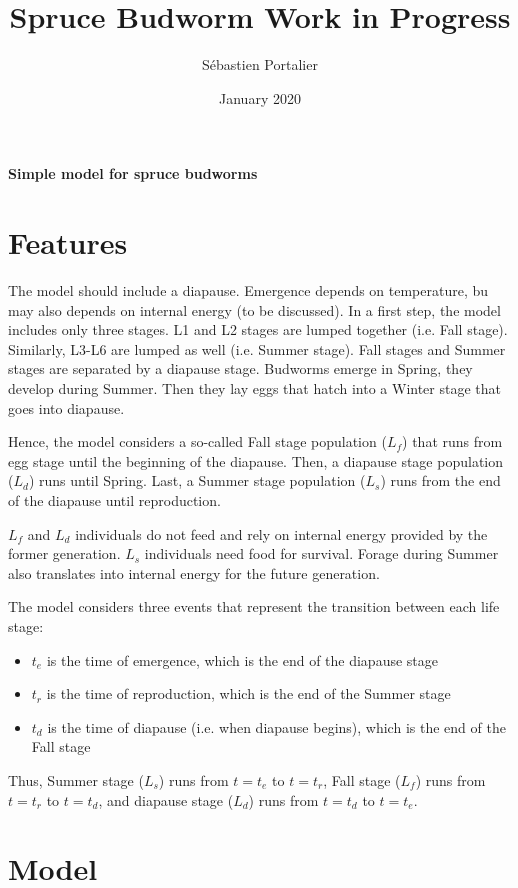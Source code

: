 \documentclass[12 pt]{article}
\title{Spruce Budworm Work in Progress}
\author{S\'ebastien Portalier}
\date{January 2020}
\begin{document}
\begin{center}
\begin{Large}
\textbf{Simple model for spruce budworms}
\end{Large}
\end{center}

\section{Features}
The model should include a diapause. Emergence depends on temperature, bu may also depends on internal energy (to be discussed). In a first step, the model includes only three stages. L1 and L2 stages are lumped together (i.e. Fall stage). Similarly, L3-L6 are lumped as well (i.e. Summer stage). Fall stages and Summer stages are separated by a diapause stage. Budworms emerge in Spring, they develop during Summer. Then they lay eggs that hatch into a Winter stage that goes into diapause. \par
Hence, the model considers a so-called Fall stage population ($L_f$) that runs from egg stage until the beginning of the diapause. Then, a diapause stage population ($L_d$) runs until Spring. Last, a Summer stage population ($L_s$) runs from the end of the diapause until reproduction. \par
$L_f$ and $L_d$ individuals do not feed and rely on internal energy provided by the former generation. $L_s$ individuals need food for survival. Forage during Summer also translates into internal energy for the future generation. \par
The model considers three events that represent the transition between each life stage: 
\begin{itemize}
\item $t_e$ is the time of emergence, which is the end of the diapause stage
\item $t_r$ is the time of reproduction, which is the end of the Summer stage
\item $t_d$ is the time of diapause (i.e. when diapause begins), which is the end of the Fall stage
\end{itemize}
Thus, Summer stage ($L_s$) runs from $t=t_e$ to $t=t_r$, Fall stage ($L_f$) runs from $t=t_r$ to $t=t_d$, and diapause stage ($L_d$) runs from $t=t_d$ to $t=t_e$.
\section{Model}
\end{document}
